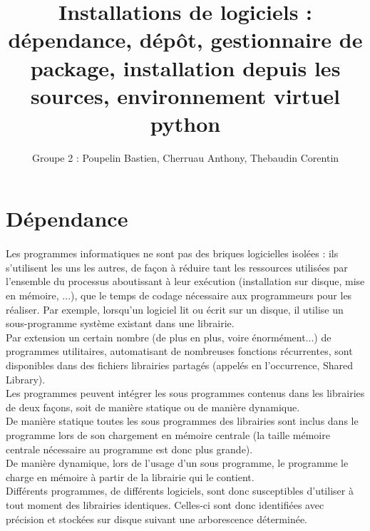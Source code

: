 \documentclass[a4paper,12pt]{article}
\title{\textbf{Installations de logiciels :} \\ dépendance, dépôt, gestionnaire de package, installation depuis les sources, environnement virtuel python}
\author{Groupe 2 : Poupelin Bastien, Cherruau Anthony, Thebaudin Corentin}
\date{}
\begin{document}
\maketitle
\clearpage
\tableofcontents

\clearpage



\section{Dépendance}
\paragraph{}
Les programmes informatiques ne sont pas des briques logicielles isolées : ils s’utilisent les uns les autres, de façon
à réduire tant les ressources utilisées par l’ensemble du processus aboutissant à leur exécution (installation sur disque, mise en mémoire, ...), 
que le temps de codage nécessaire aux programmeurs pour les réaliser. Par exemple, lorsqu’un logiciel lit ou écrit sur un disque, 
il utilise un sous-programme système existant dans une librairie.\\

Par extension un certain nombre (de plus en plus, voire énormément...) de programmes utilitaires, automatisant de nombreuses fonctions récurrentes, 
sont disponibles dans des fichiers librairies partagés (appelés en l’occurrence, Shared Library).\\

Les programmes peuvent intégrer les sous programmes contenus dans les librairies de deux façons, soit de manière statique ou de manière dynamique.\\

De manière statique toutes les sous programmes des librairies sont inclus dans le programme lors de son chargement en mémoire centrale 
(la taille mémoire centrale nécessaire au programme est donc plus grande).\\

De manière dynamique, lors de l’usage d’un sous programme, le programme le charge en mémoire à partir de la librairie qui le contient.\\

Différents programmes, de différents logiciels, sont donc susceptibles d’utiliser à tout moment des librairies identiques. 
Celles-ci sont donc identifiées avec précision  et stockées sur disque suivant une arborescence déterminée.\\
\end{document}
